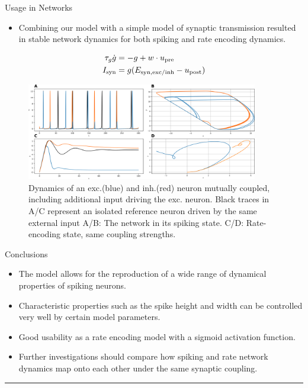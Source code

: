 \documentclass{beamer}
\begin{document}
\begin{frame}[t]
\begin{columns}[t]
\begin{column}{.45\textwidth}
\begin{myblock}{Usage in Networks}
\begin{itemize}
\item Combining our model with a simple model of synaptic transmission resulted in stable network dynamics for both spiking and rate encoding dynamics.
\end{itemize}
\begin{align*}
\tau_g \dot{g} &= -g + w \cdot u_{\rm pre} \\
I_{\rm syn} &= g(E_{\rm syn,exc/inh} - u_{\rm post})
\end{align*}
\begin{figure}
\includegraphics[width=0.9\textwidth]{../figures/graphics/network_dyn_combined.png}
\caption{Dynamics of an exc.(blue) and inh.(red) neuron mutually coupled, including additional input driving the exc. neuron. Black traces in A/C represent an isolated reference neuron driven by the same external input A/B: The network in its spiking state. C/D: Rate-encoding state, same coupling strengths.}
\end{figure}
\end{myblock}

\begin{myblock}{Conclusions}
\begin{itemize}
\item The model allows for the reproduction of a wide range of dynamical properties of spiking neurons.
\item Characteristic properties such as the spike height and width can be controlled very well by certain model parameters.
\item Good usability as a rate encoding model with a sigmoid activation function.
\item Further investigations should compare how spiking and rate network dynamics map onto each other under the same synaptic coupling.
\end{itemize}
\end{myblock}
\noindent\rule{\textwidth}{2px}
\begin{small}


\end{small}
\end{column}
\end{columns}
\end{frame}
\end{document}
